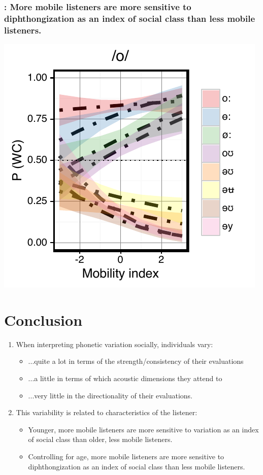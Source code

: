 \documentclass[a0,portrait]{a0poster}
\begin{document}
\begin{multicols}{3}
\subsubsection*{: More mobile listeners are more sensitive to diphthongization as an index of social class than less mobile listeners.}
\centering
\includegraphics[scale=2]{o_perception_dim3_sd.pdf}

\vspace*{-2.75cm}
\justify
\section*{Conclusion}
\vspace*{-.5cm}
\begin{enumerate}
\item{When interpreting phonetic variation socially, individuals vary:\vspace*{0.5cm}\begin{itemize}\item{...quite a lot in terms of the strength/consistency of their evaluations}\item{...a little in terms of which acoustic dimensions they attend to}\item{...very little in the directionality of their evaluations.}\end{itemize}}
\vspace*{0.5cm}
\item{This variability is related to characteristics of the listener:\vspace*{0.5cm}\begin{itemize}\item{Younger, more mobile listeners are more sensitive to  variation as an index of social class than older, less mobile listeners.}\item{Controlling for age, more mobile listeners are more sensitive to  diphthongization as an index of social class than less mobile listeners.}\end{itemize}}
\end{enumerate}

\end{multicols}
\end{document}
